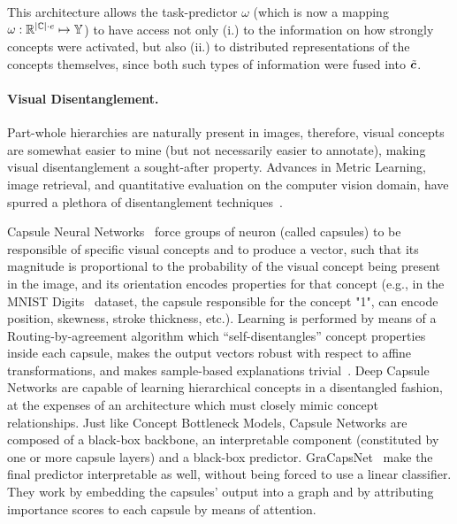 This architecture allows the task-predictor $\omega$ (which is now a mapping $\omega: \mathbb{R}^{|{\mathbb{C}}|\cdot e} \mapsto {\mathbb{Y}}$) to have access not only (i.) to the information on how strongly concepts were activated, but also (ii.) to distributed representations of the concepts themselves, since both such types of information were fused into $\tilde{{\bm{c}}}$. %


\paragraph{Visual Disentanglement.} Part-whole hierarchies are naturally present in images, therefore, visual concepts are somewhat easier to mine (but not necessarily easier to annotate), making visual disentanglement a sought-after property.
Advances in Metric Learning, image retrieval, and quantitative evaluation on the computer vision domain, have spurred a plethora of disentanglement techniques~\cite{zhang2018visual}.

Capsule Neural Networks~\cite{sabour2017dynamic} force groups of neuron (called capsules) to be responsible of specific visual concepts and to produce a vector, such that its magnitude is proportional to the probability of the visual concept being present in the image, and its orientation encodes properties for that concept (e.g., in the MNIST Digits~\cite{lecun1998mnist} dataset, the capsule responsible for the concept "1", can encode position, skewness, stroke thickness, etc.). Learning is performed by means of a Routing-by-agreement algorithm which  ``self-disentangles'' concept properties inside each capsule, makes the output vectors robust with respect to affine transformations, and makes sample-based explanations trivial~\cite{shahroudnejad2018improved}. Deep Capsule Networks are capable of learning hierarchical concepts in a disentangled fashion, at the expenses of an architecture which must closely mimic concept relationships.
Just like Concept Bottleneck Models, Capsule Networks are composed of a black-box backbone, an interpretable component (constituted by one or more capsule layers) and a black-box predictor. GraCapsNet~\cite{gu2021interpretable} make the final predictor interpretable as well, without being forced to use a linear classifier. They work by embedding the capsules' output into a graph and by attributing importance scores to each capsule by means of attention.

